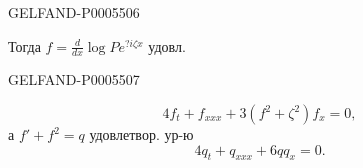 \begin{GelfandAdjacentEvidence}{GELFAND-P000550}{6}


Тогда \(f=\frac{d}{dx}\log P e^{?i\zeta x}\) удовл.
\end{GelfandAdjacentEvidence}
\begin{GelfandAdjacentEvidence}{GELFAND-P000550}{7}

\[
4f_t+f_{xxx}+3(f^2+\zeta^2)f_x=0,
\]
а \(f'+f^2=q\) удовлетвор. ур-ю
\[
4q_t+q_{xxx}+6qq_x=0.
\]
\end{GelfandAdjacentEvidence}



